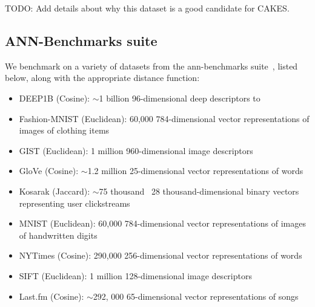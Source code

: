 TODO: Add details about why this dataset is a good candidate for CAKES.


\subsection{ANN-Benchmarks suite}
\label{subsec:datasets:ann-benchmarks-suite}

We benchmark on a variety of datasets from the ann-benchmarks suite~\cite{Aumller2018ANNBenchmarksAB}, 
listed below, along with the appropriate distance function: 

\begin{itemize} 
    \item DEEP1B (Cosine): $\sim$1 billion 96-dimensional deep descriptors to 
    \item Fashion-MNIST (Euclidean): 60,000 784-dimensional vector representations of images of clothing items
    \item GIST (Euclidean): 1 million 960-dimensional image descriptors 
    \item GloVe (Cosine): $\sim$1.2 million 25-dimensional vector representations of words
    \item Kosarak (Jaccard): $\sim$75 thousand ~28 thousand-dimensional binary vectors representing user clickstreams
    \item MNIST (Euclidean): 60,000 784-dimensional vector representations of images of handwritten digits
    \item NYTimes (Cosine): 290,000 256-dimensional vector representations of words
    \item SIFT (Euclidean): 1 million 128-dimensional image descriptors
    \item Last.fm (Cosine): $\sim$292, 000 65-dimensional vector representations of songs
\end{itemize}